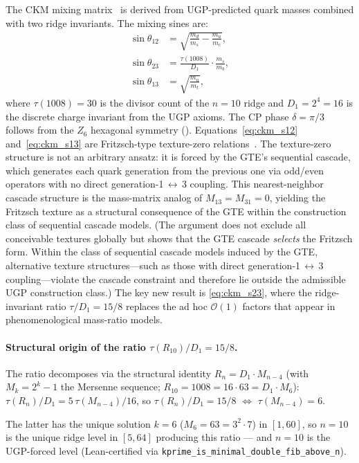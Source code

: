\documentclass[11pt]{article}
\theoremstyle{remark}
\begin{document}
The CKM mixing matrix~\cite{KobayashiMaskawa1973} is derived from UGP-predicted quark masses combined with two ridge invariants.
The mixing sines are:
\begin{align}
\sin\theta_{12} &= \sqrt{\frac{m_d}{m_s} - \frac{m_u}{m_c}}, \label{eq:ckm_s12}\\
\sin\theta_{23} &= \frac{\tau(1008)}{D_1} \cdot \frac{m_s}{m_b}, \label{eq:ckm_s23}\\
\sin\theta_{13} &= \sqrt{\frac{m_u}{m_t}}, \label{eq:ckm_s13}
\end{align}
where $\tau(1008) = 30$ is the divisor count of the $n{=}10$ ridge and $D_1 = 2^4 = 16$ is the discrete charge invariant from the UGP axioms.
The CP phase $\delta = \pi/3$ follows from the $Z_6$ hexagonal symmetry ().
Equations~\eqref{eq:ckm_s12} and~\eqref{eq:ckm_s13} are Fritzsch-type texture-zero relations~\cite{Fritzsch1977}.
The texture-zero structure is not an arbitrary ansatz: it is forced by the GTE's sequential cascade, which generates each quark generation from the previous one via odd/even operators with no direct generation-1$\,\leftrightarrow\,$3 coupling.
This nearest-neighbor cascade structure is the mass-matrix analog of $M_{13} = M_{31} = 0$, yielding the Fritzsch texture as a structural consequence of the GTE within the construction class of sequential cascade models.
(The argument does not exclude all conceivable textures globally but shows that the GTE cascade \emph{selects} the Fritzsch form.
Within the class of sequential cascade models induced by the GTE, alternative texture structures---such as those with direct generation-1$\,\leftrightarrow\,$3 coupling---violate the cascade constraint and therefore lie outside the admissible UGP construction class.)
The key new result is \eqref{eq:ckm_s23}, where the ridge-invariant ratio $\tau/D_1 = 15/8$ replaces the ad hoc $\mathcal{O}(1)$ factors that appear in phenomenological mass-ratio models.

\paragraph{Structural origin of the ratio $\tau(R_{10})/D_1 = 15/8$.}
The ratio decomposes via the structural identity $R_n = D_1 \cdot M_{n-4}$
(with $M_k = 2^k - 1$ the Mersenne sequence; $R_{10} = 1008 = 16 \cdot 63 = D_1 \cdot M_6$):
$\tau(R_n)/D_1 = 5\,\tau(M_{n-4})/16$, so $\tau(R_n)/D_1 = 15/8$
$\Leftrightarrow$ $\tau(M_{n-4}) = 6$.

\smallskip
The latter has the unique solution $k = 6$
($M_6 = 63 = 3^2 \cdot 7$) in $[1, 60]$, so $n = 10$ is the unique ridge level
in $[5, 64]$ producing this ratio --- and $n = 10$ is the UGP-forced level
(Lean-certified via \texttt{kprime\_is\_minimal\_double\_fib\_above\_n}).
\end{document}
